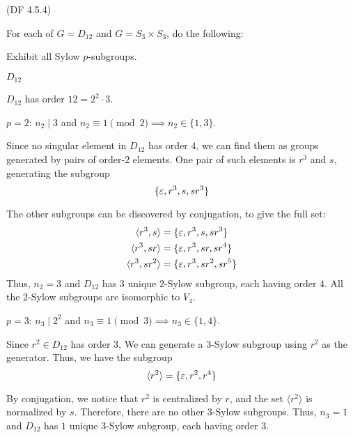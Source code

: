 \begin{problem}{(\textsf{DF 4.5.4})}

  \noindent
  For each of $G=D_{12}$ and $G=S_3 \times S_3$, do the following:
  \begin{enumalph}
    \item Exhibit all Sylow $p$-subgroups.
    \begin{Answer}
      \begin{enumalph}
        \item $D_{12}$
          
          \noindent
          $D_{12}$ has order $12 = 2^2 \cdot 3$.
          \begin{enumalph}
            \item $p=2$:
              $n_2 \mid 3$ and $n_2 \equiv 1 \pmod 2 \implies n_2 \in \{1, 3\}$.

              \noindent
              Since no singular element in $D_{12}$ has order $4$,
              we can find them as groups generated by
              pairs of order-$2$ elements.
              One pair of such elements is $r^3$ and $s$,
              generating the subgroup \[\{\varepsilon, r^3, s, sr^3 \} \]

              \noindent
              The other subgroups can be discovered by conjugation, to give the full set:
              \begin{align*}
                \langle r^3, s \rangle &= \{\varepsilon, r^3, s, sr^3 \} \\
                \langle r^3, sr \rangle &= \{\varepsilon, r^3, sr, sr^4 \} \\
                \langle r^3, sr^2 \rangle &= \{\varepsilon, r^3, sr^2, sr^5 \}
              \end{align*}
              \noindent
              Thus, $n_2 = 3$ and $D_{12}$ has $3$ unique $2$-Sylow subgroup,
              each having order $4$.
              All the $2$-Sylow subgroups are isomorphic to $V_4$.

            \item $p=3$:
              $n_3 \mid 2^2$ and $n_3 \equiv 1 \pmod 3 \implies n_3 \in \{1, 4\}$.

              \noindent
              Since $r^2 \in D_{12}$ has order $3$,
              We can generate a $3$-Sylow subgroup using $r^2$ as the generator.
              Thus, we have the subgroup \[\langle r^2 \rangle = \{\varepsilon, r^2, r^4 \}\]

              By conjugation, we notice that $r^2$ is centralized by $r$,
              and the set $\langle r^2 \rangle$ is normalized by $s$.
              Therefore, there are no other $3$-Sylow subgroups.
              \noindent
              Thus, $n_3 = 1$ and $D_{12}$ has $1$ unique $3$-Sylow subgroup,
              each having order $3$.
          \end{enumalph}


\end{enumalph}
\end{Answer}
\end{enumalph}
\end{problem}
